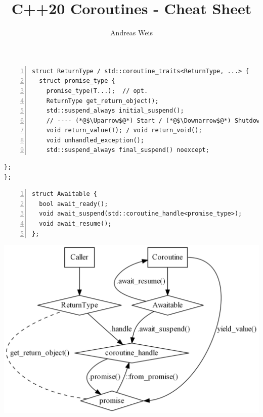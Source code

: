 \documentclass[32pt]{article}
\title{C++20 Coroutines - Cheat Sheet}
\author{Andreas Weis}
\newif\ifnocolors
\begin{document}
  \ifnocolors
  \begin{lstlisting}[style=cpp20,numbers=left]
struct ReturnType / std::coroutine_traits<ReturnType, ...> { 
  struct promise_type {
    promise_type(T...);  // opt.
    ReturnType get_return_object();
    std::suspend_always initial_suspend();
    // ---- (*@$\Uparrow$@*) Start / (*@$\Downarrow$@*) Shutdown ----
    void return_value(T); / void return_void();
    void unhandled_exception();
    std::suspend_always final_suspend() noexcept;
\end{lstlisting}\begin{lstlisting}[style=cpp20]
  };
};
  \end{lstlisting}

  \begin{lstlisting}[style=cpp20,numbers=left]
struct Awaitable {
  bool await_ready();
  void await_suspend(std::coroutine_handle<promise_type>);
  void await_resume(); 
};
\end{lstlisting}

  \includegraphics[height=.5\textheight]{gfx/figure_bw.png}
  
  \else
\end{document}
